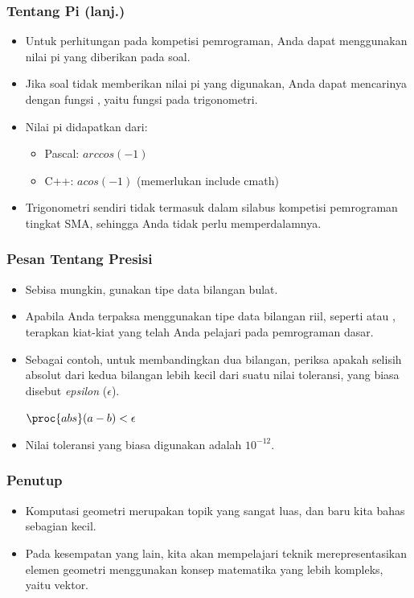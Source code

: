 \begin{frame}
\frametitle{Tentang Pi (lanj.)}
\begin{itemize}
  \item Untuk perhitungan pada kompetisi pemrograman, Anda dapat menggunakan nilai pi yang diberikan pada soal.
  \item Jika soal tidak memberikan nilai pi yang digunakan, Anda dapat mencarinya dengan fungsi , yaitu fungsi pada trigonometri.
  \item Nilai pi didapatkan dari:
  \begin{itemize}
    \item Pascal: $arccos(-1)$
    \item C++: $acos(-1)$ (memerlukan include cmath)
  \end{itemize}
  \item Trigonometri sendiri tidak termasuk dalam silabus kompetisi pemrograman tingkat SMA, sehingga Anda tidak perlu memperdalamnya.
\end{itemize}
\end{frame}

\begin{frame}
\frametitle{Pesan Tentang Presisi}
\begin{itemize}
  \item Sebisa mungkin, gunakan tipe data bilangan bulat.
  \item Apabila Anda terpaksa menggunakan tipe data bilangan riil, seperti  atau , terapkan kiat-kiat yang telah Anda pelajari pada pemrograman dasar.
  \item Sebagai contoh, untuk membandingkan dua bilangan, periksa apakah selisih absolut dari kedua bilangan lebih kecil dari suatu nilai toleransi, yang biasa disebut \textit{epsilon} ($\epsilon$).
  \begin{codebox}
     \Return $\proc{abs}(a - b) < \epsilon$
  \end{codebox}
  \item Nilai toleransi yang biasa digunakan adalah $10^{-12}$.
\end{itemize}
\end{frame}

\begin{frame}
\frametitle{Penutup}
\begin{itemize}
  \item Komputasi geometri merupakan topik yang sangat luas, dan baru kita bahas sebagian kecil.
  \item Pada kesempatan yang lain, kita akan mempelajari teknik merepresentasikan elemen geometri menggunakan konsep matematika yang lebih kompleks, yaitu vektor.
\end{itemize}
\end{frame}


